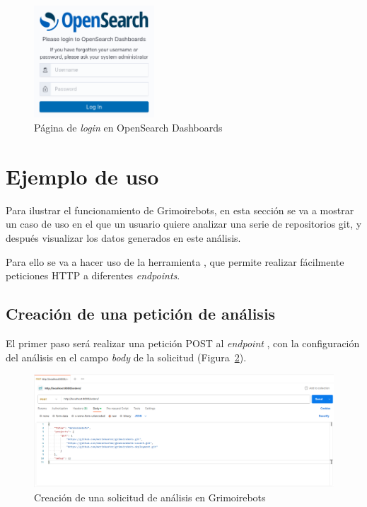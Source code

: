 \begin{figure}[ht]
    \centering
    \includegraphics[width=0.4\textwidth]{Figures/opensearch-dashboards-login}
    \decoRule
    \caption[OpenSearch Dashboards (\emph{Login})]{Página de \emph{login} en OpenSearch Dashboards}
    \label{fig:opensearch-dashboards-login}
\end{figure}

\section{Ejemplo de uso}

Para ilustrar el funcionamiento de Grimoirebots, en esta sección se va a mostrar un caso de uso en el que un usuario quiere analizar una serie de repositorios git, y después visualizar los datos generados en este análisis.

Para ello se va a hacer uso de la herramienta , que permite realizar fácilmente peticiones HTTP a diferentes \emph{endpoints}.

\subsection{Creación de una petición de análisis}

El primer paso será realizar una petición POST al \emph{endpoint} , con la configuración del análisis en el campo \emph{body} de la solicitud (Figura~\ref{fig:example1}).

\begin{figure}[ht]
    \centering
    \includegraphics[width=\textwidth]{Figures/example1}
    \decoRule
    \caption[Grimoirebots (Creación de análisis)]{Creación de una solicitud de análisis en Grimoirebots}
    \label{fig:example1}
\end{figure}

